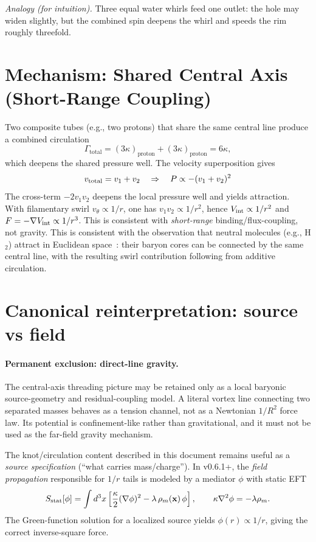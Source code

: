 \documentclass[11pt]{article}
\begin{document}
            \emph{Analogy (for intuition).} Three equal water whirls feed one outlet: the hole may widen slightly, but the combined spin deepens the whirl and speeds the rim roughly threefold.





\section{Mechanism: Shared Central Axis (Short-Range Coupling)}
    Two composite tubes (e.g., two protons) that share the same central line produce a combined circulation
    \[
        \Gamma_{\mathrm{total}} = (3 \kappa)_{\mathrm{proton}} + (3 \kappa)_{\mathrm{proton}} = 6 \kappa,
    \]
    which deepens the shared pressure well. The velocity superposition gives
    \[
    v_{\rm total}=v_1+v_2
    \quad\Rightarrow\quad
    P\propto-(v_1+v_2)^2
    \]
    The cross-term $-2v_1v_2$ deepens the local pressure well and yields attraction. With filamentary swirl
    $v_\theta\propto 1/r$, one has $v_1v_2\propto 1/r^2$, hence $V_{\rm int}\propto 1/r^2$ and
    $F=-\nabla V_{\rm int}\propto 1/r^3$. This is consistent with \emph{short-range} binding/flux-coupling, not gravity.
    This is consistent with the observation that neutral molecules (e.g., H$_2$) attract in Euclidean space~\cite{london1930,casimirpolder1948}: their baryon cores can be connected by the same central line, with the resulting swirl contribution following from additive circulation.

\section{Canonical reinterpretation: source vs field}


\paragraph{Permanent exclusion: direct-line gravity.}
The central-axis threading picture may be retained only as a local baryonic
source-geometry and residual-coupling model.  A literal vortex line connecting
two separated masses behaves as a tension channel, not as a Newtonian
\(1/R^2\) force law.  Its potential is confinement-like rather than
gravitational, and it must not be used as the far-field gravity mechanism.

The knot/circulation content described in this document remains useful as a \emph{source specification} (``what carries
mass/charge''). In v0.6.1+, the \emph{field propagation} responsible for $1/r$ tails is modeled by a mediator $\phi$ with
static EFT
\[
S_{\rm stat}[\phi]=\int d^3x\left[\frac{\kappa}{2}(\nabla\phi)^2-\lambda\,\rho_m(\mathbf{x})\,\phi\right],
\qquad
\kappa\nabla^2\phi=-\lambda\rho_m.
\]
The Green-function solution for a localized source yields $\phi(r)\propto 1/r$, giving the correct inverse-square force.
\end{document}
